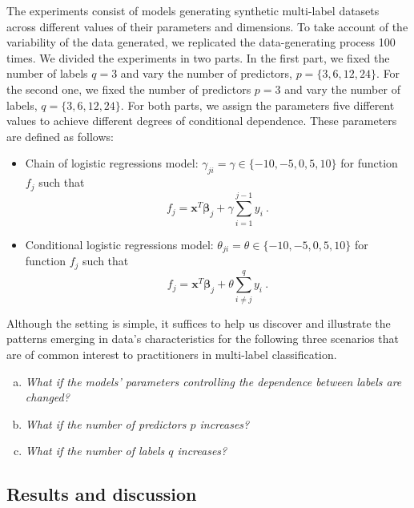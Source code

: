 \documentclass[review]{elsarticle}
\begin{document}
The experiments consist of models generating synthetic multi-label datasets across different values of their parameters and dimensions. To take account of the variability of the data generated, we replicated the data-generating process 100 times. We divided the experiments in two parts. In the first part, we fixed the number of labels $q=3$ and vary the number of predictors, $p = \{ 3, 6, 12, 24\}$. For the second one, we fixed the number of predictors $p = 3$ and vary the number of labels, $q = \{ 3, 6,1 2, 24\}$. For both parts, we assign the parameters five different values to achieve different degrees of conditional dependence. These parameters are defined as follows:
\begin{itemize}
	\item Chain of logistic regressions model: $\gamma_{{j}i} = \gamma \in \{ -10, -5, 0, 5, 10 \}$ for function $f_{j}$ such that
	\begin{equation}\label{eq:param:gamma}
		f_{j} = \mathbf{x}^T\bm{\beta}_j + \gamma \sum_{i=1}^{j-1} y_{i}\ .
	\end{equation}
	\item Conditional logistic regressions model: $\theta_{ji} = \theta \in \{ -10, -5, 0, 5, 10\}$ for function $f_{j}$ such that
	\begin{equation}\label{eq:param:theta}
		f_{j} = \mathbf{x}^T \bm{\beta}_j + \theta \sum^{q}_{i \neq j}{y_{i}}\ .
	\end{equation}
\end{itemize}

Although the setting is simple, it suffices to help us discover and illustrate the patterns emerging in data's characteristics for the following three scenarios that are of common interest to practitioners in multi-label classification.
\begin{enumerate}[(a)]
	\item \emph{What if the models' parameters controlling the dependence between labels are changed?} 
	\item  \emph{What if the number of predictors $p$ increases?} 
	\item \emph{What if the number of labels $q$ increases?} 
\end{enumerate}


\subsection{Results and discussion}
\end{document}
